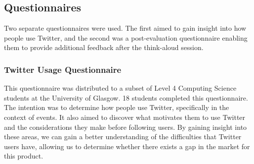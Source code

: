 \documentclass{l4proj}
\begin{document}
    \subsection{Questionnaires}
    Two separate questionnaires were used. The first aimed to gain insight into how people use Twitter, and the second was a post-evaluation questionnaire enabling them to provide additional feedback after the think-aloud session.
    
        \subsubsection{Twitter Usage Questionnaire}
        This questionnaire was distributed to a subset of Level 4 Computing Science students at the University of Glasgow. 18 students completed this questionnaire. The intention was to determine how people use Twitter, specifically in the context of events. It also aimed to discover what motivates them to use Twitter and the considerations they make before following users. By gaining insight into these areas, we can gain a better understanding of the difficulties that Twitter users have, allowing us to determine whether there exists a gap in the market for this product.
\end{document}
